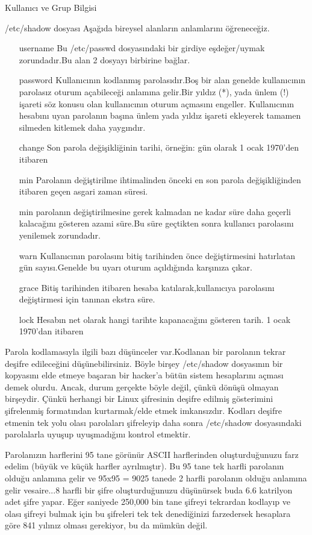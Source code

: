 \begin{section}{Kullanıcı ve Grup Bilgisi}
\begin{subsection}{/etc/shadow dosyası}
Aşağıda bireysel alanların anlamlarını öğreneceğiz.
\begin{itemize}
\item[username]Bu /etc/passwd dosyasındaki bir girdiye eşdeğer/uymak zorundadır.Bu alan 2 dosyayı birbirine bağlar.
\item[password]Kullanıcının kodlanmış parolasıdır.Boş bir alan genelde kullanıcının parolasız oturum açabileceği anlamına gelir.Bir yıldız (*),
yada ünlem (!) işareti söz konusu olan kullanıcının oturum açmasını engeller. Kullanıcının hesabını uyan parolanın başına ünlem yada yıldız
işareti ekleyerek tamamen silmeden kitlemek daha yaygındır.
\item[change]Son parola değişikliğinin tarihi, örneğin: gün olarak 1 ocak 1970'den itibaren
\item[min]Parolanın değiştirilme ihtimalinden önceki en son parola değişikliğinden itibaren geçen asgari zaman süresi.
\item[min]parolanın değiştirilmesine gerek kalmadan ne kadar süre daha geçerli kalacağını gösteren azami süre.Bu süre geçtikten sonra kullanıcı
parolasını yenilemek zorundadır.
\item[warn]Kullanıcının parolasını bitiş tarihinden önce değiştirmesini hatırlatan gün sayısı.Genelde bu uyarı oturum açıldığında karşınıza çıkar.
\item[grace]Bitiş tarihinden itibaren hesaba katılarak,kullanıcıya parolasını değiştirmesi için tanınan ekstra süre.
\item[lock]Hesabın net olarak hangi tarihte kapanacağını gösteren tarih. 1 ocak 1970'dan itibaren
\end{itemize}

Parola kodlamasıyla ilgili bazı düşünceler var.Kodlanan bir parolanın tekrar deşifre edileceğini düşünebilirsiniz. Böyle birşey /etc/shadow dosyasının bir kopyasını elde etmeye başaran bir hacker'a bütün sistem hesaplarını açması demek olurdu. Ancak, durum gerçekte böyle değil, çünkü dönüşü olmayan birşeydir. Çünkü herhangi bir Linux şifresinin deşifre edilmiş gösterimini şifrelenmiş formatından kurtarmak/elde etmek imkansızdır. Kodları deşifre etmenin tek yolu olası parolaları şifreleyip daha sonra /etc/shadow dosyasındaki parolalarla uyuşup uyuşmadığını kontrol etmektir.

Parolanızın harflerini 95 tane görünür ASCII harflerinden oluşturduğunuzu farz edelim (büyük ve küçük harfler ayrılmıştır). Bu 95 tane tek harfli parolanın olduğu anlamına gelir ve 95x95 = 9025 tanede 2 harfli parolanın olduğu anlamına gelir vesaire...8 harfli bir şifre oluşturduğunuzu düşünürsek buda 6.6 katrilyon adet şifre yapar. Eğer saniyede 250,000 bin tane şifreyi tekrardan kodlayıp ve olası şifreyi bulmak için bu şifreleri tek tek denediğinizi farzedersek hesaplara göre 841 yılınız olması gerekiyor, bu da mümkün değil.


\end{subsection}
\end{section}
